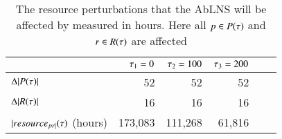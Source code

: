 \begin{table}[H]
	\centering
	\begin{tabular}{lrrrrr}
	\toprule
	                                    & $\tau_1 = 0$ & $\tau_2 = 100$ & $\tau_3 = 200$ \\ \midrule
	$\Delta |P(\tau)|$               & 52                     & 52                     & 52                   \\ \midrule
	$\Delta |R(\tau)|$             & 16                     & 16                     & 16                   \\ \midrule
	$ |resource_{pr|}(\tau)$ (hours)& 173,083                 & 111,268                 & 61,816                \\ \bottomrule
	\end{tabular}
	\caption{The resource perturbations that the AbLNS will be affected by measured in hours.
		Here all $p \in P(\tau)$ and $r \in R(\tau)$ are 
		affected}\label{tab:resources:resource-subtraction}
\end{table}
